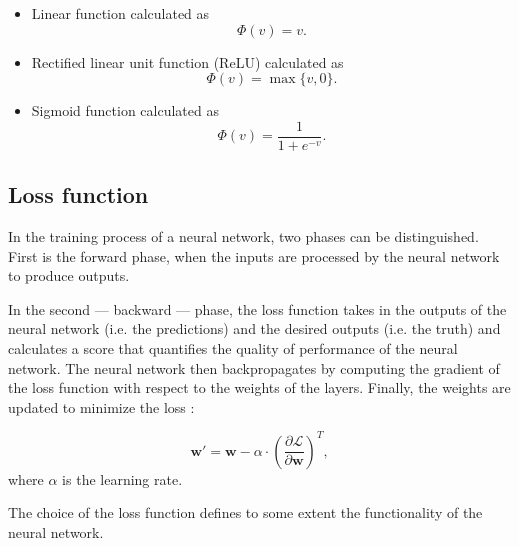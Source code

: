 \documentclass{ctuthesis}
\begin{document}
\begin{itemize}
    \item Linear function calculated as \cite[p.13]{data_augmentation}
    \begin{equation}
        \Phi(v) = v.
    \end{equation}
    
    \item Rectified linear unit function (ReLU) calculated as \cite[p.14]{data_augmentation}
    \begin{equation}
        \Phi(v) = \max\{v,0\}.
    \end{equation}
    
    \item Sigmoid function calculated as \cite[p.13]{data_augmentation}
    \begin{equation}
        \Phi(v) = \frac{1}{1+e^{-v}}.
    \end{equation}
\end{itemize}

\begin{figure}[h]
\end{figure}

\subsection{Loss function}
In the training process of a neural network, two phases can be distinguished. First is the forward phase, when the inputs are processed by the neural network to produce outputs.

In the second — backward — phase, the loss function takes in the outputs of the neural network (i.e. the predictions) and the desired outputs (i.e. the truth) and calculates a score that quantifies the quality of performance of the neural network. The neural network then backpropagates by computing the gradient of the loss function with respect to the weights of the layers. Finally, the weights are updated to minimize the loss \cite[p.22]{data_augmentation}\cite{backpropagation}:

\begin{equation}
        \mathbf{w}' = \mathbf{w} - \alpha \cdot (\frac{\partial \mathcal{L}}{\partial \mathbf{w}})^T,
\end{equation}
where $\alpha$ is the learning rate.

The choice of the loss function defines to some extent the functionality of the neural network. %
\end{document}
